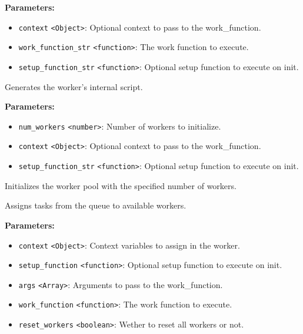 \documentclass[12pt,a4paper]{article}
\begin{document}
\noindent \textbf{Parameters:}
\begin{itemize}
  \item \texttt{context} \texttt{<Object>}: Optional context to pass to the work\_function.
  \item \texttt{work\_function\_str} \texttt{<function>}: The work function to execute.
  \item \texttt{setup\_function\_str} \texttt{<function>}: Optional setup function to execute on init.
\end{itemize}

\noindent Generates the worker's internal script.

\vspace{5mm}
\noindent {}


\noindent \textbf{Parameters:}
\begin{itemize}
  \item \texttt{num\_workers} \texttt{<number>}: Number of workers to initialize.
  \item \texttt{context} \texttt{<Object>}: Optional context to pass to the work\_function.
  \item \texttt{setup\_function\_str} \texttt{<function>}: Optional setup function to execute on init.
\end{itemize}

\noindent Initializes the worker pool with the specified number of workers.

\vspace{5mm}
\noindent {}


\noindent Assigns tasks from the queue to available workers.

\vspace{5mm}
\noindent {}


\noindent \textbf{Parameters:}
\begin{itemize}
  \item \texttt{context} \texttt{<Object>}: Context variables to assign in the worker.
  \item \texttt{setup\_function} \texttt{<function>}: Optional setup function to execute on init.
  \item \texttt{args} \texttt{<Array>}: Arguments to pass to the work\_function.
  \item \texttt{work\_function} \texttt{<function>}: The work function to execute.
  \item \texttt{reset\_workers} \texttt{<boolean>}: Wether to reset all workers or not.
\end{itemize}
\end{document}
